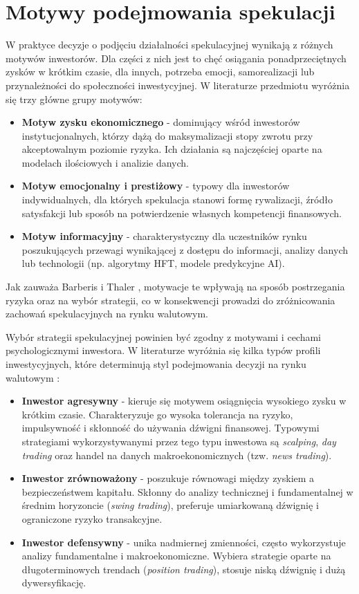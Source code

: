\section{Motywy podejmowania spekulacji}

W praktyce decyzje o podjęciu działalności spekulacyjnej wynikają z różnych motywów inwestorów. 
Dla części z nich jest to chęć osiągania ponadprzeciętnych zysków w krótkim czasie, dla innych, potrzeba emocji, samorealizacji lub przynależności do społeczności inwestycyjnej.  
W literaturze przedmiotu \parencite{shefrin2007} wyróżnia się trzy główne grupy motywów:

\begin{itemize}
\item \textbf{Motyw zysku ekonomicznego} - dominujący wśród inwestorów instytucjonalnych, którzy dążą do maksymalizacji stopy zwrotu przy akceptowalnym poziomie ryzyka. 
Ich działania są najczęściej oparte na modelach ilościowych i analizie danych.
\item \textbf{Motyw emocjonalny i prestiżowy} - typowy dla inwestorów indywidualnych, dla których spekulacja stanowi formę rywalizacji, 
źródło satysfakcji lub sposób na potwierdzenie własnych kompetencji finansowych.
\item \textbf{Motyw informacyjny} - charakterystyczny dla uczestników rynku poszukujących przewagi wynikającej z dostępu do informacji, 
analizy danych lub technologii (np. algorytmy HFT, modele predykcyjne AI).
\end{itemize}

Jak zauważa Barberis i Thaler \parencite{barberis2003}, motywacje te wpływają na sposób postrzegania ryzyka oraz na wybór strategii, 
co w konsekwencji prowadzi do zróżnicowania zachowań spekulacyjnych na rynku walutowym.

Wybór strategii spekulacyjnej powinien być zgodny z motywami i cechami psychologicznymi inwestora. W literaturze wyróżnia się kilka typów profili inwestycyjnych, które determinują styl podejmowania decyzji na rynku walutowym \parencite{shefrin2007}:

\begin{itemize}
\item \textbf{Inwestor agresywny} - kieruje się motywem osiągnięcia wysokiego zysku w krótkim czasie. 
Charakteryzuje go wysoka tolerancja na ryzyko, impulsywność i skłonność do używania dźwigni finansowej. 
Typowymi strategiami wykorzystywanymi przez tego typu inwestowa są \emph{scalping}, \emph{day trading} oraz handel na danych makroekonomicznych (tzw. \emph{news trading}).
\item \textbf{Inwestor zrównoważony} - poszukuje równowagi między zyskiem a bezpieczeństwem kapitału. 
Skłonny do analizy technicznej i fundamentalnej w średnim horyzoncie (\emph{swing trading}), preferuje umiarkowaną dźwignię i ograniczone ryzyko transakcyjne.
\item \textbf{Inwestor defensywny} - unika nadmiernej zmienności, często wykorzystuje analizy fundamentalne i makroekonomiczne. Wybiera strategie oparte na długoterminowych trendach (\emph{position trading}),
stosuje niską dźwignię i dużą dywersyfikację.
\end{itemize}


